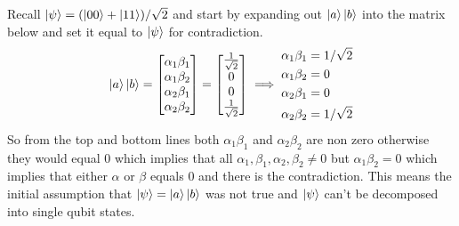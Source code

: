 \documentclass[12pt]{exam}
\begin{document}
\begin{solution}
    Recall $\ket{\psi}= (\ket{00}+\ket{11})/\sqrt{2}$ and start by expanding out $\ket{a}\ket{b}$ into the matrix below and set it equal to $\ket{\psi}$ for contradiction.
    $$\ket{a}\ket{b}
    = \begin{bmatrix}
        \alpha_1\beta_1 \\ \alpha_1\beta_2 \\ \alpha_2\beta_1 \\ \alpha_2\beta_2
    \end{bmatrix} 
    = \begin{bmatrix}
       \frac{1}{\sqrt{2}} \\ 0 \\ 0 \\ \frac{1}{\sqrt{2}}
    \end{bmatrix}  
    \implies  \begin{aligned}
        \alpha_1\beta_1 &=  1/\sqrt{2} \\ \alpha_1\beta_2 &= 0\\ \alpha_2\beta_1 &= 0\\ \alpha_2\beta_2 &= 1/\sqrt{2}
\end{aligned}$$
 So from the top and bottom lines both $\alpha_1\beta_1$ and $\alpha_2\beta_2$ are non zero otherwise they would equal 0 which implies that all $\alpha_1,\beta_1,\alpha_2,\beta_2 \neq 0$ but $\alpha_1\beta_2 = 0$ which implies that either $\alpha$ or $\beta$ equals 0 and there is the contradiction. This means the initial assumption that $\ket{\psi}= \ket{a}\ket{b}$ was not true and $\ket{\psi}$ can't be decomposed into single qubit states.
\end{solution}
\end{document}
